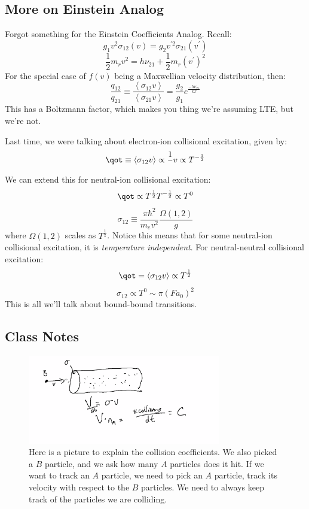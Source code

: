 \documentclass{article}
\def\sigot{\sigma_{12}}
\def\inv#1{\frac1{#1}}
\def\hf{\frac12}
\def\inv#1{{\frac{1}{}#1}}
\def\mean#1{\left\langle {#1}\right\rangle}
\def\sigot{\sigma_{12}}
\def\hf{\frac12}
\begin{document}
\subsection{ More on Einstein Analog }
Forgot something for the Einstein Coefficients Analog.  Recall:
$$g_1v^2\sigma_{12}(v)=g_2v^{\prime2}\sigma_{21}(v^\prime)$$
$$\hf m_rv^2=h\nu_{21}+\hf m_r(v^\prime)^2$$
For the special case of $f(v)$ being a Maxwellian velocity distribution, then:
$$\frac{q_{12}}{q_{21}}\equiv\frac{\mean{\sigma_{12}v}}{\mean{\sigma_{21}v}}
=\frac{g_2}{g_1}e^\frac{-h\nu_{21}}{kT}$$
This has a Boltzmann factor, which makes you thing we're assuming LTE, but
we're not. \par
Last time, we were talking about electron-ion collisional excitation, given by:
$$\qot\equiv\mean{\sigot v}\propto\inv{v}\propto T^{-\hf}$$
We can extend this for neutral-ion collisional excitation:
$$\qot \propto T^\hf T^{-\hf} \propto T^0$$
$$\sigot\equiv\frac{\pi\hbar^2}{ m_ev^2}\frac{\Omega(1,2)}{ g}$$
where $\Omega(1,2)$ scales as $T^\hf$.  Notice this means that for some
neutral-ion collisional excitation, it is {\it temperature independent}.
For neutral-neutral collisional excitation:
$$\qot=\mean{\sigot v}\propto T^\hf$$
$$\sigot\propto T^0\sim \pi(Fa_0)^2$$
This is all we'll talk about bound-bound transitions.


\subsection{Class Notes}

\begin{figure}
    \centering
    \includegraphics[width=0.75\textwidth]{Screen Shot 2020-10-08 at 11.20.59 AM.png}
    \caption{Here is a picture to explain the collision coefficients. We also picked a $B$ particle, and we ask how many $A$ particles does it hit. If we want to track an $A$ particle, we need to pick an $A$ particle, track its velocity with respect to the $B$ particles. We need to always keep track of the particles we are colliding.}
    \label{fig:coeffs}
\end{figure}
\end{document}
